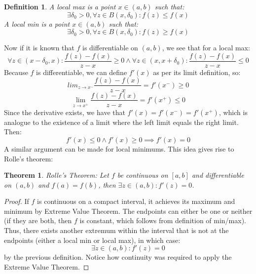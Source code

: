 \documentclass[10pt,letterpaper]{article} %
\newtheorem{thm}{Theorem}[section]
\newtheorem{defn}{Definition}[section]
\begin{document}
\medskip
\begin{defn}
A local max is a point $x \in (a, b)$ such that:
\begin{equation*}
\exists \delta_0 > 0, \forall z \in B(x, \delta_0): f(z) \leqslant f(x)
\end{equation*}
A local min is a point $x \in (a, b)$ such that:
\begin{equation*}
\exists \delta_0 > 0, \forall z \in B(x, \delta_0): f(z) \geqslant f(x)
\end{equation*}
\end{defn}
Now if it is known that $f$ is differentiable on $(a, b)$, we see that for a local max:
\begin{equation*}
\forall z \in (x - \delta_0, x): \frac{f(z) - f(x)}{z-x} \geqslant 0 \land \forall z \in (x, x+\delta_0): \frac{f(z) - f(x)}{z-x} \leqslant 0
\end{equation*}
Because $f$ is differentiable, we can define $f'(x)$ as per its limit definition, so:
\begin{equation*}
lim_{z \xrightarrow{} x^-}\frac{f(z) - f(x)}{z-x} = f'(x^-) \geqslant 0
\end{equation*}
\begin{equation*}
\lim_{z \xrightarrow{} x^+}\frac{f(z) - f(x)}{z-x} = f'(x^+) \leqslant 0
\end{equation*}
Since the derivative exists, we have that $f'(x) = f'(x^-) = f'(x^+)$, which is analogue to the existence of a limit where the left limit equals the right limit. Then:
\begin{equation*}
f'(x) \leqslant 0 \land f'(x) \geqslant 0 \implies f'(x) = 0
\end{equation*}
A similar argument can be made for local minimums. This idea gives rise to Rolle's theorem:

\medskip
\begin{thm}
Rolle's Theorem: Let $f$ be continuous on $[a, b]$ and differentiable on $(a, b)$ and $f(a) = f(b)$, then $\exists z \in (a, b): f'(z) = 0$.
\end{thm}
\begin{proof}
If $f$ is continuous on a compact interval, it achieves its maximum and minimum by Extreme Value Theorem. The endpoints can either be one or neither (if they are both, then $f$ is constant, which follows from definition of min/max).\\

Thus, there exists another extremum within the interval that is not at the endpoints (either a local min or local max), in which case:
\begin{equation*}
\exists z \in (a, b): f'(z) = 0
\end{equation*}
by the previous definition. Notice how continuity was required to apply the Extreme Value Theorem. 
\end{proof}
\end{document}
